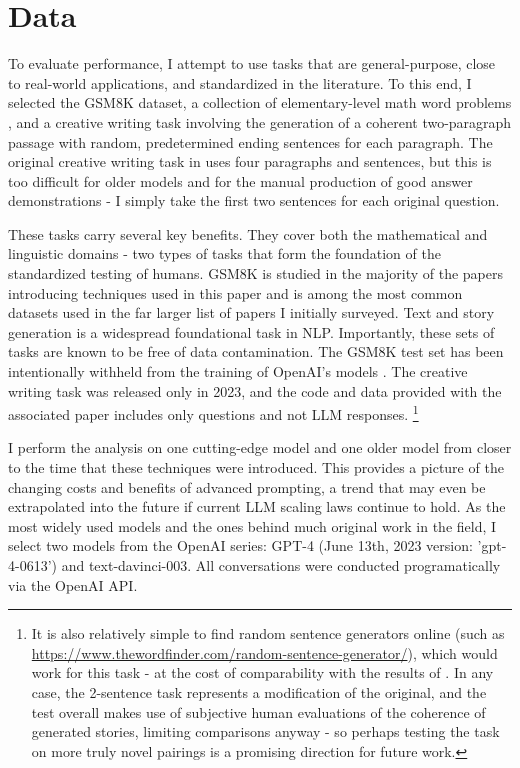 \documentclass[11pt]{article}
\begin{document}
\section*{Data}

To evaluate performance, I attempt to use tasks that are general-purpose, close to real-world applications, and standardized in the literature. To this end, I selected the GSM8K dataset, a collection of elementary-level math word problems \cite{cobbe_training_2021}, and a creative writing task involving the generation of a coherent two-paragraph passage with random, predetermined ending sentences for each paragraph. The original creative writing task in \citealp{yao_tree_2023} uses four paragraphs and sentences, but this is too difficult for older models and for the manual production of good answer demonstrations - I simply take the first two sentences for each original question. 

These tasks carry several key benefits. They cover both the mathematical and linguistic domains - two types of tasks that form the foundation of the standardized testing of humans. GSM8K is studied in the majority of the papers introducing techniques used in this paper and is among the most common datasets used in the far larger list of papers I initially surveyed. Text and story generation is a widespread foundational task in NLP. Importantly, these sets of tasks are known to be free of data contamination. The GSM8K test set has been intentionally withheld from the training of OpenAI's models \cite{openai_gpt-4_2023}. The creative writing task was released only in 2023, and the code and data provided with the associated paper includes only questions and not LLM responses. \footnote{It is also relatively simple to find random sentence generators online (such as \url{https://www.thewordfinder.com/random-sentence-generator/}), which would work for this task - at the cost of comparability with the results of \cite{yao_tree_2023}. In any case, the 2-sentence task represents a modification of the original, and the test overall makes use of subjective human evaluations of the coherence of generated stories, limiting comparisons anyway - so perhaps testing the task on more truly novel pairings is a promising direction for future work.}

I perform the analysis on one cutting-edge model and one older model from closer to the time that these techniques were introduced. This provides a picture of the changing costs and benefits of advanced prompting, a trend that may even be extrapolated into the future if current LLM scaling laws continue to hold. As the most widely used models and the ones behind much original work in the field, I select two models from the OpenAI series: GPT-4 (June 13th, 2023 version: 'gpt-4-0613') and text-davinci-003. All conversations were conducted programatically via the OpenAI API.
\end{document}
